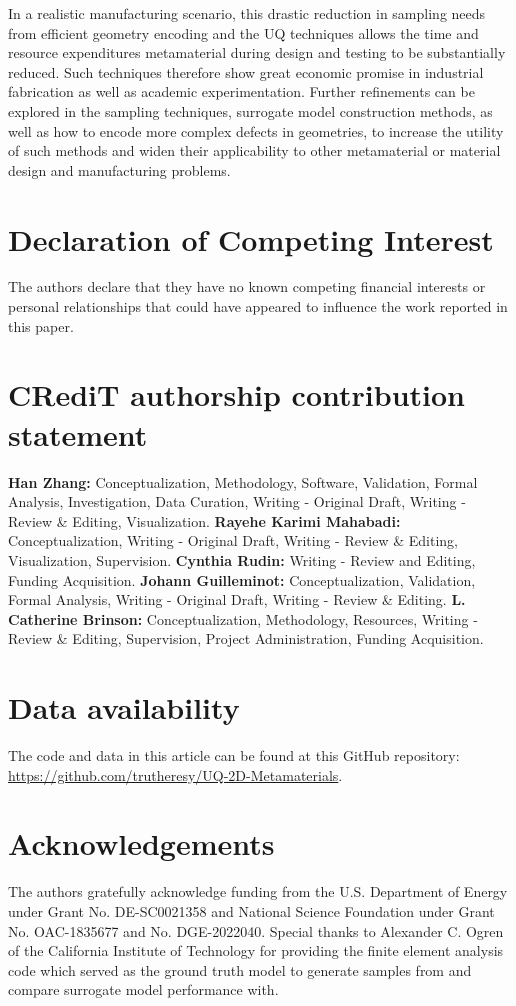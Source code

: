 \documentclass[preprint,review,12pt]{elsarticle}
\begin{document}
In a realistic manufacturing scenario, this drastic reduction in sampling needs from efficient geometry encoding and the UQ techniques allows the time and resource expenditures metamaterial during design and testing to be substantially reduced. Such techniques therefore show great economic promise in industrial fabrication as well as academic experimentation. Further refinements can be explored in the sampling techniques, surrogate model construction methods, as well as how to encode more complex defects in geometries, to increase the utility of such methods and widen their applicability to other metamaterial or material design and manufacturing problems.

\section*{Declaration of Competing Interest}
The authors declare that they have no known competing financial interests or personal relationships that could have appeared to influence the work reported in this paper.

\section*{CRediT authorship contribution statement}
\textbf{Han Zhang:} Conceptualization, Methodology, Software, Validation, Formal Analysis, Investigation, Data Curation, Writing - Original Draft, Writing - Review \& Editing, Visualization. \textbf{Rayehe Karimi Mahabadi:} Conceptualization, Writing - Original Draft, Writing - Review \& Editing, Visualization, Supervision. \textbf{Cynthia Rudin:} Writing - Review and Editing, Funding Acquisition. \textbf{Johann Guilleminot:} Conceptualization, Validation, Formal Analysis, Writing - Original Draft, Writing - Review \& Editing. \textbf{L. Catherine Brinson:} Conceptualization, Methodology, Resources, Writing - Review \& Editing, Supervision, Project Administration, Funding Acquisition.

\section*{Data availability}
The code and data in this article
can be found at this GitHub repository:
\url{https://github.com/trutheresy/UQ-2D-Metamaterials}.

\section*{Acknowledgements}
The authors gratefully acknowledge funding from the U.S. Department of Energy under Grant No. DE-SC0021358 and National Science Foundation under Grant No. OAC-1835677 and  No. DGE-2022040. Special thanks to Alexander C. Ogren of the California Institute of Technology for providing the finite element analysis code which served as the ground truth model to generate samples from and compare surrogate model performance with. 
\end{document}
